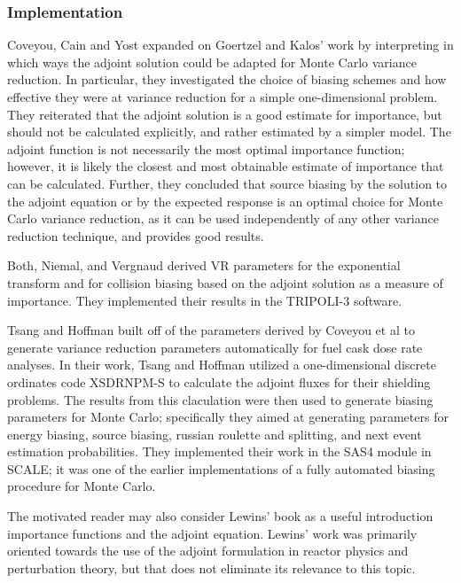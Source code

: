 \subsubsection{Implementation}

Coveyou, Cain and Yost \cite{coveyou_adjoint_1967} expanded on Goertzel and Kalos' work by interpreting in which ways the adjoint solution could be adapted for Monte Carlo variance reduction. In particular, they investigated the choice of biasing schemes and how effective they were at variance reduction for a simple one-dimensional problem. They reiterated that the adjoint solution is a good estimate for importance, but should not be calculated explicitly, and rather estimated by a simpler model. The adjoint function is not necessarily the most optimal importance function; however, it is likely the closest and most obtainable estimate of importance that can be calculated. Further, they concluded that source biasing by the solution to the adjoint equation or by the expected response is an optimal choice for Monte Carlo variance reduction, as it can be used independently of any other variance reduction technique, and provides good results. 

Both, Niemal, and Vergnaud \cite{both_automated_1990} derived VR parameters for the exponential transform and for collision biasing based on the adjoint solution as a measure of importance. They implemented their results in the TRIPOLI-3 software. 

Tsang and Hoffman \cite{tsang_monte_1988} built off of the parameters derived by Coveyou et al \cite{coveyou_adjoint_1967} to generate variance reduction parameters automatically for fuel cask dose rate analyses. In their work, Tsang and Hoffman utilized a one-dimensional discrete ordinates code XSDRNPM-S to calculate the adjoint fluxes for their shielding problems. The results from this claculation were then used to generate biasing parameters for Monte Carlo; specifically they aimed at generating parameters for energy biasing, source biasing, russian roulette and splitting, and next event estimation probabilities. They implemented their work in the SAS4 module in SCALE; it was one of the earlier implementations of a fully automated biasing procedure for Monte Carlo. 
 

The motivated reader may also consider Lewins' book \cite{lewins_importance:_1965} as a
useful introduction importance functions and the adjoint equation. Lewins' work was
primarily oriented towards the use of the adjoint formulation in reactor physics and
perturbation theory, but that does not eliminate its relevance to this topic. 


